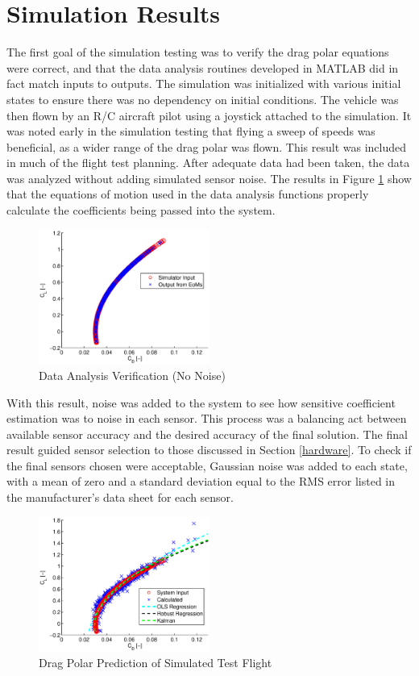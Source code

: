 \section{Simulation Results}
The first goal of the simulation testing was to verify the drag polar equations were correct, and that the data analysis routines developed in MATLAB did in fact match inputs to outputs. The simulation was initialized with various initial states to ensure there was no dependency on initial conditions. The vehicle was then flown by an R/C aircraft pilot using a joystick attached to the simulation. It was noted early in the simulation testing that flying a sweep of speeds was beneficial, as a wider range of the drag polar was flown. This result was included in much of the flight test planning. After adequate data had been taken, the data was analyzed without adding simulated sensor noise. The results in Figure \ref{dragPolarNoNoise} show that the equations of motion used in the data analysis functions properly calculate the coefficients being passed into the system.

\begin{figure}[H]
  \centering
  
    \includegraphics[width=0.5\textwidth]{figures/dragPolarNoNoise.eps}
    \caption{Data Analysis Verification (No Noise)}
        \label{dragPolarNoNoise}
\end{figure}

With this result, noise was added to the system to see how sensitive coefficient estimation was to noise in each sensor. This process was a balancing act between available sensor accuracy and the desired accuracy of the final solution. The final result guided sensor selection to those discussed in Section \ref{hardware}. To check if the final sensors chosen were acceptable, Gaussian noise was added to each state, with a mean of zero and a standard deviation equal to the RMS error listed in the manufacturer's data sheet for each sensor.
\begin{figure}[H]
  \centering
    \includegraphics[width=0.5\textwidth]{figures/simDragPolarNoise.eps}
      \caption{Drag Polar Prediction of Simulated Test Flight} \label{dragPolarNoise}
\end{figure}

